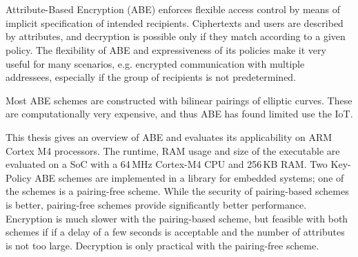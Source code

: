 \chapter{\abstractname}


Attribute-Based Encryption (ABE) enforces flexible access control by means of implicit specification of intended recipients.
Ciphertexts and users are described by attributes, and decryption is possible only if they match according to a given policy.
The flexibility of ABE and expressiveness of its policies make it very useful for many scenarios, e.g. encrypted communication with multiple addressees, especially if the group of recipients is not predetermined.

Most ABE schemes are constructed with bilinear pairings of elliptic curves.
These are computationally very expensive, and thus ABE has found limited use the IoT.

This thesis gives an overview of ABE and evaluates its applicability on ARM Cortex M4 processors.
The runtime, RAM usage and size of the executable are evaluated on a SoC with a 64\,MHz Cortex-M4 CPU and 256\,KB RAM.
Two Key-Policy ABE schemes are implemented in a library for embedded systems; one of the schemes is a pairing-free scheme.
While the security of pairing-based schemes is better, pairing-free schemes provide significantly better performance.
Encryption is much slower with the pairing-based scheme, but feasible with both schemes if if a delay of a few seconds is acceptable and the number of attributes is not too large.
Decryption is only practical with the pairing-free scheme.